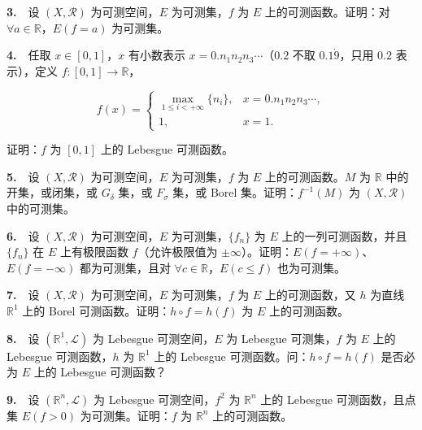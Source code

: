 \documentclass[11pt,a4paper]{article}
\begin{document}
\par{}\noindent \textbf{3.}　设 \((X,\mathcal R)\) 为可测空间，\(E\) 为可测集，\(f\) 为 \(E\) 上的可测函数。证明：对 \(\forall a\in\mathbb R\)，\(E(f=a)\) 为可测集。

\par{}\noindent \textbf{4.}　任取 \(x\in[0,1]\)，\(x\) 有小数表示 \(x=0.n_1n_2n_3\cdots\)（\(0.2\) 不取 \(0.1\dot9\)，只用 \(0.2\) 表示），定义 \(f:[0,1]\to\mathbb R\)，

\[
f(x)=\begin{cases}\max_{1\le i<+\infty}\{n_i\},&x=0.n_1n_2n_3\cdots,\\1,&x=1.\end{cases}
\]

证明：\(f\) 为 \([0,1]\) 上的 Lebesgue 可测函数。

\par{}\noindent \textbf{5.}　设 \((X,\mathcal R)\) 为可测空间，\(E\) 为可测集，\(f\) 为 \(E\) 上的可测函数。\(M\) 为 \(\mathbb R\) 中的开集，或闭集，或 \(G_\delta\) 集，或 \(F_\sigma\) 集，或 Borel 集。证明：\(f^{-1}(M)\) 为 \((X,\mathcal R)\) 中的可测集。

\par{}\noindent \textbf{6.}　设 \((X,\mathcal R)\) 为可测空间，\(E\) 为可测集，\(\{f_n\}\) 为 \(E\) 上的一列可测函数，并且 \(\{f_n\}\) 在 \(E\) 上有极限函数 \(f\)（允许极限值为 \(\pm\infty\)）。证明：\(E(f=+\infty)\)、\(E(f=-\infty)\) 都为可测集，且对 \(\forall c\in\mathbb R\)，\(E(c\le f)\) 也为可测集。

\par{}\noindent \textbf{7.}　设 \((X,\mathcal R)\) 为可测空间，\(E\) 为可测集，\(f\) 为 \(E\) 上的可测函数，又 \(h\) 为直线 \(\mathbb R^1\) 上的 Borel 可测函数。证明：\(h\circ f=h(f)\) 为 \(E\) 上的可测函数。

\par{}\noindent \textbf{8.}　设 \((\mathbb R^1,\mathcal L)\) 为 Lebesgue 可测空间，\(E\) 为 Lebesgue 可测集，\(f\) 为 \(E\) 上的 Lebesgue 可测函数，\(h\) 为 \(\mathbb R^1\) 上的 Lebesgue 可测函数。问：\(h\circ f=h(f)\) 是否必为 \(E\) 上的 Lebesgue 可测函数？

\par{}\noindent \textbf{9.}　设 \((\mathbb R^n,\mathcal L)\) 为 Lebesgue 可测空间，\(f^2\) 为 \(\mathbb R^n\) 上的 Lebesgue 可测函数，且点集 \(E(f>0)\) 为可测集。证明：\(f\) 为 \(\mathbb R^n\) 上的可测函数。
\end{document}
